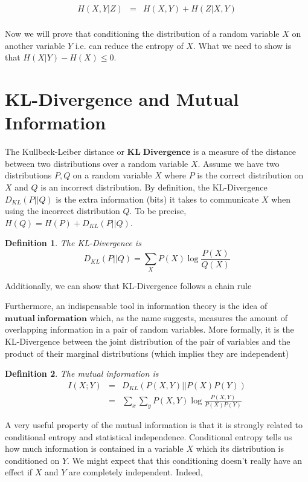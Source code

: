 \documentclass[a4paper,11pt]{book}
\newtheorem{definition}{Definition}
\begin{document}
\begin{eqnarray*}
H(X,Y|Z) &=& H(X,Y) + H(Z|X,Y)\\
\end{eqnarray*}


Now we will prove that conditioning the distribution of a random variable $X$ on another variable $Y$ i.e. can reduce the entropy of $X$. What we need to show is that $H(X|Y) - H(X) \leq 0$.


\section{KL-Divergence and Mutual Information}

The Kullbeck-Leiber distance or $\mathbf{KL\;Divergence}$ is a measure of the distance between two distributions over a random variable $X$. Assume we have two distributions $P,Q$ on a random variable $X$ where $P$ is the correct distribution on $X$ and $Q$ is an incorrect distribution. By definition, the KL-Divergence $D_{KL}(P||Q)$ is the extra information (bits) it takes to communicate $X$ when using the incorrect distribution $Q$. To be precise, $H(Q) = H(P) + D_{KL}(P||Q)$.

\begin{definition}
The KL-Divergence is 
\begin{equation*}
D_{KL}(P||Q) = \sum_{X} P(X) \log \frac{P(X)}{Q(X)}
\end{equation*}
\end{definition}

Additionally, we can show that KL-Divergence follows a chain rule 

Furthermore, an indispensable tool in information theory is the idea of $\mathbf{mutual\;information}$ which, as the name suggests, measures the amount of overlapping information in a pair of random variables. More formally, it is the KL-Divergence between the joint distribution of the pair of variables and the product of their marginal distributions (which implies they are independent)

\begin{definition}
The mutual information is 
\begin{eqnarray*}
I(X;Y) &=& D_{KL}(P(X,Y)||P(X)P(Y)) \\
&=& \sum_{x}\sum_{y} P(X,Y) \log \frac{P(X,Y)}{P(X)P(Y)}
\end{eqnarray*}
\end{definition}

A very useful property of the mutual information is that it is strongly related to conditional entropy and statistical independence. Conditional entropy tells us how much information is contained in a variable $X$ which its distribution is conditioned on $Y$. We might expect that this conditioning doesn't really have an effect if $X$ and $Y$ are completely independent. Indeed,
\end{document}
